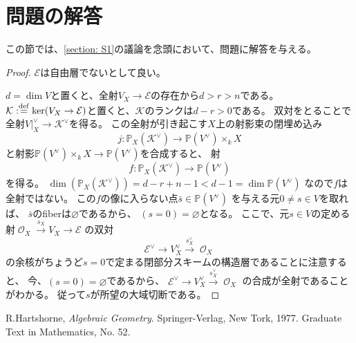 \documentclass[uplatex]{jsarticle}
\theoremstyle{definition}
\renewcommand{\P}{\mathbb{P}}
\newcommand{\mcE}{\mathcal{E}}
\newcommand{\mcK}{\mathcal{K}}
\newcommand{\mcO}{\mathcal{O}}
\DeclareMathOperator{\OOO}{\mcO}
\newcommand{\OX}{\OOO_X}
\renewcommand{\emptyset}{\varnothing}
\newcommand{\dfn}{:\overset{\mathrm{\scriptsize def}}{=}}
\begin{document}
\section{問題の解答}


この節では、\autoref{section: S1}の議論を念頭において、問題に解答を与える。


\begin{proof}
  \(\mcE\)は自由層でないとして良い。

  \(d=\dim V\)と置くと、全射\(V_X\to \mcE\)の存在から\(d > r > n\)である。
  \(\mcK\dfn \ker (V_X\to \mcE)\)と置くと、\(\mcK\)のランクは\(d-r > 0\)である。
  双対をとることで全射\(V|_X^{\vee} \to \mcK^{\vee}\)を得る。
  この全射が引き起こす\(X\)上の射影束の閉埋め込み
  \[
  j:\P_X(\mcK^{\vee})\to \P(V^{\vee})\times_k X
  \]
  と射影\(\P(V^{\vee})\times_k X\to \P(V^{\vee})\)を合成すると、
  射
  \[
  f:\P_X(\mcK^{\vee})\to \P(V^{\vee})
  \]
  を得る。
  \(\dim (\P_X(\mcK^{\vee})) = d-r+n-1 < d-1 = \dim \P(V^{\vee})\)
  なので\(f\)は全射ではない。
  この\(f\)の像に入らない点\(\bar{s}\in \P(V^{\vee})\)
  を与える元\(0\neq s\in V\)を取れば、
  \(\bar{s}\)のfiberは\(\emptyset\)であるから、
  \((s=0)=\emptyset\)となる。
  ここで、元\(s\in V\)の定める射\(\OX\xrightarrow{s_X}V_X \to \mcE\)
  の双対
  \[
  \mcE^{\vee}\to V^{\vee}_X \xrightarrow{s_X^{\vee}} \OX
  \]
  の余核がちょうど\(s=0\)で定まる閉部分スキームの構造層であることに注意すると、
  今、\((s=0)=\emptyset\)であるから、
  \(\mcE^{\vee}\to V^{\vee}_X \xrightarrow{s_X^{\vee}} \OX\)
  の合成が全射であることがわかる。
  従って\(s\)が所望の大域切断である。
\end{proof}








\begin{thebibliography}{9}
  R.Hartshorne,
  \textit{Algebraic Geometry}.
  Springer-Verlag, New Tork, 1977. Graduate Text in Mathematics, No. 52.
\end{thebibliography}
\end{document}
